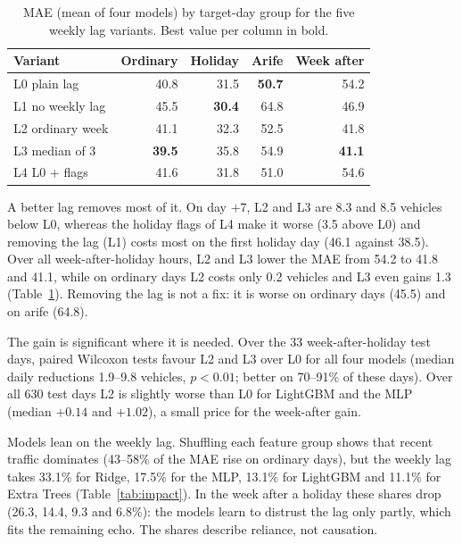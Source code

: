 \documentclass[sigconf]{acmart}
\begin{document}
\begin{table}[t]
  \caption{MAE (mean of four models) by target-day group for the five weekly lag variants. Best value per column in bold.}
  \label{tab:lag}
  \small
  \setlength{\tabcolsep}{4pt}
  \begin{tabular}{lrrrr}
    \toprule
    Variant & Ordinary & Holiday & Arife & Week after \\
    \midrule
    L0 plain lag      & 40.8 & 31.5 & \textbf{50.7} & 54.2 \\
    L1 no weekly lag  & 45.5 & \textbf{30.4} & 64.8 & 46.9 \\
    L2 ordinary week  & 41.1 & 32.3 & 52.5 & 41.8 \\
    L3 median of 3    & \textbf{39.5} & 35.8 & 54.9 & \textbf{41.1} \\
    L4 L0 + flags     & 41.6 & 31.8 & 51.0 & 54.6 \\
    \bottomrule
  \end{tabular}
\end{table}

A better lag removes most of it. On day $+7$, L2 and L3 are 8.3 and 8.5 vehicles below L0, whereas the holiday flags of L4 make it worse (3.5 above L0) and removing the lag (L1) costs most on the first holiday day (46.1 against 38.5). Over all week-after-holiday hours, L2 and L3 lower the MAE from 54.2 to 41.8 and 41.1, while on ordinary days L2 costs only 0.2 vehicles and L3 even gains 1.3 (Table~\ref{tab:lag}). Removing the lag is not a fix: it is worse on ordinary days (45.5) and on arife (64.8).

The gain is significant where it is needed. Over the 33 week-after-holiday test days, paired Wilcoxon tests favour L2 and L3 over L0 for all four models (median daily reductions 1.9--9.8 vehicles, $p<0.01$; better on 70--91\% of these days). Over all 630 test days L2 is slightly worse than L0 for LightGBM and the MLP (median $+0.14$ and $+1.02$), a small price for the week-after gain.

Models lean on the weekly lag. Shuffling each feature group \cite{breiman2001,fisher2019} shows that recent traffic dominates (43--58\% of the MAE rise on ordinary days), but the weekly lag takes 33.1\% for Ridge, 17.5\% for the MLP, 13.1\% for LightGBM and 11.1\% for Extra Trees (Table~\ref{tab:impact}). In the week after a holiday these shares drop (26.3, 14.4, 9.3 and 6.8\%): the models learn to distrust the lag only partly, which fits the remaining echo. The shares describe reliance, not causation.
\end{document}
